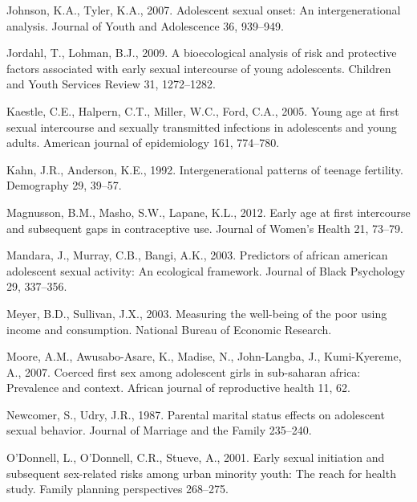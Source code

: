 \documentclass[
]{article}
\newlength{\cslhangindent}
\newenvironment{cslreferences}%
  {\setlength{\parindent}{0pt}%
  \everypar{\setlength{\hangindent}{\cslhangindent}}\ignorespaces}%
  {\par}
\begin{document}
\begin{cslreferences}
\leavevmode\hypertarget{ref-johnson2007adolescent}{}%
Johnson, K.A., Tyler, K.A., 2007. Adolescent sexual onset: An
intergenerational analysis. Journal of Youth and Adolescence 36,
939--949.

\leavevmode\hypertarget{ref-jordahl2009bioecological}{}%
Jordahl, T., Lohman, B.J., 2009. A bioecological analysis of risk and
protective factors associated with early sexual intercourse of young
adolescents. Children and Youth Services Review 31, 1272--1282.

\leavevmode\hypertarget{ref-kaestle2005young}{}%
Kaestle, C.E., Halpern, C.T., Miller, W.C., Ford, C.A., 2005. Young age
at first sexual intercourse and sexually transmitted infections in
adolescents and young adults. American journal of epidemiology 161,
774--780.

\leavevmode\hypertarget{ref-kahn1992intergenerational}{}%
Kahn, J.R., Anderson, K.E., 1992. Intergenerational patterns of teenage
fertility. Demography 29, 39--57.

\leavevmode\hypertarget{ref-magnusson2012early}{}%
Magnusson, B.M., Masho, S.W., Lapane, K.L., 2012. Early age at first
intercourse and subsequent gaps in contraceptive use. Journal of Women's
Health 21, 73--79.

\leavevmode\hypertarget{ref-mandara2003predictors}{}%
Mandara, J., Murray, C.B., Bangi, A.K., 2003. Predictors of african
american adolescent sexual activity: An ecological framework. Journal of
Black Psychology 29, 337--356.

\leavevmode\hypertarget{ref-meyer2003measuring}{}%
Meyer, B.D., Sullivan, J.X., 2003. Measuring the well-being of the poor
using income and consumption. National Bureau of Economic Research.

\leavevmode\hypertarget{ref-moore2007coerced}{}%
Moore, A.M., Awusabo-Asare, K., Madise, N., John-Langba, J.,
Kumi-Kyereme, A., 2007. Coerced first sex among adolescent girls in
sub-saharan africa: Prevalence and context. African journal of
reproductive health 11, 62.

\leavevmode\hypertarget{ref-newcomer1987parental}{}%
Newcomer, S., Udry, J.R., 1987. Parental marital status effects on
adolescent sexual behavior. Journal of Marriage and the Family 235--240.

\leavevmode\hypertarget{ref-o2001early}{}%
O'Donnell, L., O'Donnell, C.R., Stueve, A., 2001. Early sexual
initiation and subsequent sex-related risks among urban minority youth:
The reach for health study. Family planning perspectives 268--275.


\end{cslreferences}
\end{document}
